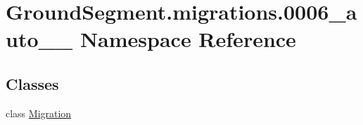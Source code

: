 \hypertarget{namespace_ground_segment_1_1migrations_1_10006__auto__20161126__1611}{}\section{Ground\+Segment.\+migrations.0006\+\_\+auto\+\_\+\_ Namespace Reference}
\label{namespace_ground_segment_1_1migrations_1_10006__auto__20161126__1611}
\subsection*{Classes}
\begin{DoxyCompactItemize}
\item 
class \hyperlink{class_ground_segment_1_1migrations_1_10006__auto__20161126__1611_1_1_migration}{Migration}
\end{DoxyCompactItemize}
